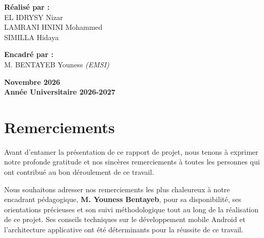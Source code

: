 \documentclass[12pt,a4paper]{report}
\begin{document}
\begin{titlepage}
\begin{center}
\begin{minipage}{0.45\textwidth}
            \begin{flushleft}
                \textbf{R\'ealis\'e par :} \\
                \vspace{0.2cm}
                EL IDRYSY Nizar \\
                LAMRANI HNINI Mohammed \\
                SIMILLA Hidaya \\
            \end{flushleft}
        \end{minipage}
        \hfill
        \begin{minipage}{0.50\textwidth}
            \begin{flushright}
                \textbf{Encadr\'e par :} \\
                \vspace{0.2cm}
                M. BENTAYEB Youness \textit{(EMSI)}\\
            \end{flushright}
        \end{minipage}

        \vfill
        \textbf{Novembre 2026} \\
        \textbf{Ann\'ee Universitaire 2026-2027}
    \end{center}
\end{titlepage}

\setcounter{page}{1}
\pagestyle{plain}

\chapter*{Remerciements}

Avant d'entamer la pr\'esentation de ce rapport de projet, nous tenons \`a exprimer notre profonde gratitude et nos sinc\`eres remerciements \`a toutes les personnes qui ont contribu\'e au bon d\'eroulement de ce travail.

Nous souhaitons adresser nos remerciements les plus chaleureux \`a notre encadrant p\'edagogique, \textbf{M. Youness Bentayeb}, pour sa disponibilit\'e, ses orientations pr\'ecieuses et son suivi m\'ethodologique tout au long de la r\'ealisation de ce projet. Ses conseils techniques sur le d\'eveloppement mobile Android et l'architecture applicative ont \'et\'e d\'eterminants pour la r\'eussite de ce travail.
\end{document}
